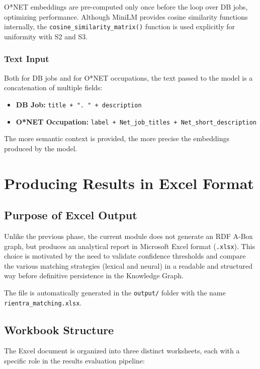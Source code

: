 \documentclass[12pt, a4paper]{report}
\begin{document}
O*NET embeddings are pre-computed only once before the
loop over DB jobs, optimizing performance. Although MiniLM
provides cosine similarity functions internally, the
\texttt{cosine\_similarity\_matrix()} function is used explicitly for
uniformity with S2 and S3.

\newpage
\subsection{Text Input}

Both for DB jobs and for O*NET occupations, the text passed
to the model is a concatenation of multiple fields:

\begin{itemize}
  \item \textbf{DB Job:} \texttt{title + ". " + description}
  \item \textbf{O*NET Occupation:} \texttt{label + Net\_job\_titles + Net\_short\_description}
\end{itemize}

The more semantic context is provided, the more precise the
embeddings produced by the model.


% 
\chapter{Producing Results in Excel Format}
% 

\section{Purpose of Excel Output}

Unlike the previous phase, the current module does not generate an RDF A-Box graph, but produces an analytical report in Microsoft Excel format (\texttt{.xlsx}). This choice is motivated by the need to validate confidence thresholds and compare the various matching strategies (lexical and neural) in a readable and structured way before definitive persistence in the Knowledge Graph.

The file is automatically generated in the \texttt{output/} folder with the name\\ \texttt{rientra\_matching.xlsx}.

\section{Workbook Structure}

The Excel document is organized into three distinct worksheets, each with a specific role in the results evaluation pipeline:
\end{document}
